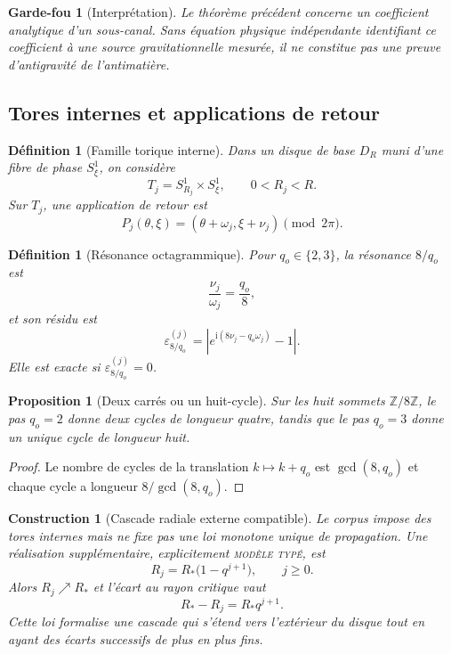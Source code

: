 \documentclass[11pt,a4paper]{article}
\newtheorem{proposition}[theorem]{Proposition}
\newtheorem{definition}[theorem]{Définition}
\newtheorem{construction}[theorem]{Construction}
\newtheorem{guardrail}[theorem]{Garde-fou}
\newcommand{\Z}{\mathbb Z}
\newcommand{\ii}{\mathrm i}
\newcommand{\eps}{\varepsilon}
\newcommand{\statusTyped}{\textsc{modèle typé}}
\begin{document}
\begin{guardrail}[Interprétation]
Le théorème précédent concerne un coefficient analytique d'un sous-canal. Sans équation physique indépendante identifiant ce coefficient à une source gravitationnelle mesurée, il ne constitue pas une preuve d'antigravité de l'antimatière.
\end{guardrail}

\subsection{Tores internes et applications de retour}

\begin{definition}[Famille torique interne]
Dans un disque de base $D_R$ muni d'une fibre de phase $S^1_\xi$, on considère
\[
 T_j=S^1_{R_j}\times S^1_\xi,
 \qquad 0<R_j<R.
\]
Sur $T_j$, une application de retour est
\[
 P_j(\theta,\xi)=(\theta+\omega_j,\xi+\nu_j)\pmod{2\pi}.
\]
\end{definition}

\begin{definition}[Résonance octagrammique]
Pour $q_o\in\{2,3\}$, la résonance $8/q_o$ est
\[
 \frac{\nu_j}{\omega_j}=\frac{q_o}{8},
\]
et son résidu est
\[
 \eps_{8/q_o}^{(j)}=
 \left|e^{\ii(8\nu_j-q_o\omega_j)}-1\right|.
\]
Elle est exacte si $\eps_{8/q_o}^{(j)}=0$.
\end{definition}

\begin{proposition}[Deux carrés ou un huit-cycle]
Sur les huit sommets $\Z/8\Z$, le pas $q_o=2$ donne deux cycles de longueur quatre, tandis que le pas $q_o=3$ donne un unique cycle de longueur huit.
\end{proposition}

\begin{proof}
Le nombre de cycles de la translation $k\mapsto k+q_o$ est $\gcd(8,q_o)$ et chaque cycle a longueur $8/\gcd(8,q_o)$.
\end{proof}

\begin{construction}[Cascade radiale externe compatible]\label{cons:outward}
Le corpus impose des tores internes mais ne fixe pas une loi monotone unique de propagation. Une réalisation supplémentaire, explicitement \statusTyped, est
\[
 R_j=R_*\bigl(1-q^{j+1}\bigr),\qquad j\ge0.
\]
Alors $R_j\nearrow R_*$ et l'écart au rayon critique vaut
\[
 R_*-R_j=R_*q^{j+1}.
\]
Cette loi formalise une cascade qui s'étend vers l'extérieur du disque tout en ayant des écarts successifs de plus en plus fins.
\end{construction}
\end{document}
